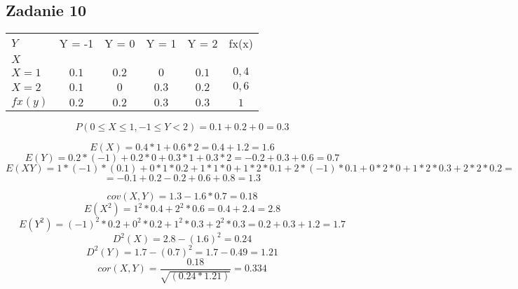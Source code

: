 \subsection{Zadanie 10}
\begin{center}
\begin{tabular}{ | l | c | c | c | c | c | }
\hline  
 \qquad  $Y$ & Y = -1 & Y = 0 & Y = 1 & Y = 2 & fx(x) \\
  $X$ &  &  &  &  &  \\
\hline  
 $X = 1$ & $0.1$ & $0.2$ & $0$ & $0.1$ & $0,4$ \\
\hline  
 $X = 2$ & $0.1$ & $0$ & $0.3$ & $0.2$ & $0,6$\\
\hline 
$fx(y)$ & $0.2$ & $0.2$ & $0.3$ & $0.3$ & $1$\\
\hline  
\end{tabular}
\end{center}

$$
P ( 0 \leq X \leq 1, -1 \leq Y < 2) = 0.1 + 0.2 + 0 = 0.3
$$

$$
E(X) = 0.4 * 1 + 0.6 * 2 = 0.4 + 1.2 = 1.6
$$
$$
E(Y) = 0.2 * (-1) + 0.2 * 0 + 0.3 * 1 + 0.3 * 2 = -0.2 + 0.3 + 0.6 = 0.7
$$
$$
E(XY) = 1 * (-1) * (0.1) + 0 * 1 * 0.2 + 1 * 1 * 0 + 1 * 2 * 0.1 + 2 * (-1) * 0.1 + 0 * 2 * 0 + 1 * 2 * 0.3 + 2 *2 *0.2 =
$$
$$ 
= -0.1 + 0.2 - 0.2 + 0.6 + 0.8 = 1.3
$$

$$
cov(X,Y) = 1.3 - 1.6 *0.7 = 0.18
$$
$$
E(X^2) = 1^2 *0.4 + 2^2 * 0.6 = 0.4 + 2.4 = 2.8
$$
$$
E(Y^2) = (-1)^2 *0.2 + 0^2 *0.2 + 1^2*0.3 + 2^2*0.3 = 0.2 +0.3+1.2 = 1.7
$$
$$
D^2(X) = 2.8 - (1.6)^2 = 0.24
$$
$$
D^2(Y) = 1.7 - (0.7)^2 = 1.7 - 0.49 = 1.21
$$
$$
cor(X, Y) = \frac{0.18}{\sqrt{(0.24*1.21)}} = 0.334
$$

